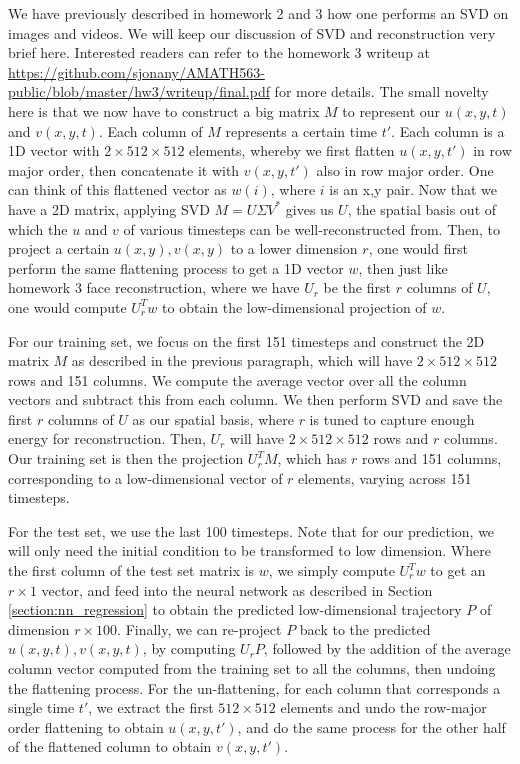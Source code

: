 \documentclass[letterpaper, 10 pt, conference]{ieeeconf}  %
\begin{document}
We have previously described in homework 2 and 3 how one performs an SVD on images and videos. We will keep our discussion of SVD and reconstruction very brief here. Interested readers can refer to the homework 3 writeup at
 \url{https://github.com/sjonany/AMATH563-public/blob/master/hw3/writeup/final.pdf} for more details. The small novelty here is that we now have to construct a big matrix $M$ to represent our $u(x,y,t)$ and $v(x,y,t)$. Each column of $M$ represents a certain time $t'$. Each column is a 1D vector with $2 \times 512 \times 512$ elements, whereby we first flatten $u(x,y,t')$ in row major order, then concatenate it with $v(x,y,t')$ also in row major order. One can think of this flattened vector as $w(i)$, where $i$ is an x,y pair. Now that we have a 2D matrix, applying SVD $M = U\Sigma V^*$ gives us $U$, the spatial basis out of which the $u$ and $v$ of various timesteps can be well-reconstructed from. Then, to project a certain $u(x,y), v(x,y)$ to a lower dimension $r$, one would first perform the same flattening process to get a 1D vector $w$, then just like homework 3 face reconstruction, where we have $U_r$ be the first $r$ columns of $U$, one would compute $U_r^T w$ to obtain the low-dimensional projection of $w$.

For our training set, we focus on the first 151 timesteps and construct the 2D matrix $M$ as described in the previous paragraph, which will have $2 \times 512 \times 512$ rows and 151 columns. We compute the average vector over all the column vectors and subtract this from each column. We then perform SVD and save the first $r$ columns of $U$ as our spatial basis, where $r$ is tuned to capture enough energy for reconstruction. Then, $U_r$ will have $2 \times 512 \times 512$ rows and $r$ columns. Our training set is then the projection $U_r^T M$, which has $r$ rows and 151 columns, corresponding to a low-dimensional vector of $r$ elements, varying across 151 timesteps.

For the test set, we use the last 100 timesteps.
Note that for our prediction, we will only need the initial condition to be transformed to low dimension.
Where the first column of the test set matrix is $w$, we simply compute $U_r^T w$ to get an $r \times 1$ vector, and feed into the neural network as described in Section \ref{section:nn_regression} to obtain the predicted low-dimensional trajectory $P$ of dimension $r \times 100$.
Finally, we can re-project $P$ back to the predicted $u(x,y,t), v(x,y,t)$, by computing $U_r P$, followed by the addition of the average column vector computed from the training set to all the columns, then undoing the flattening process. For the un-flattening, for each column that corresponds a single time $t'$, we extract the first $512 \times 512$ elements and undo the row-major order flattening to obtain $u(x,y,t')$, and do the same process for the other half of the flattened column to obtain $v(x,y,t')$.
\end{document}
